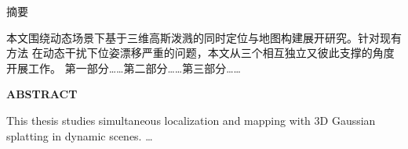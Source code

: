 %
%
%

\begin{center}
{\heiti{} 摘\quad 要}
\end{center}

\vspace{1\baselineskip}


本文围绕动态场景下基于三维高斯泼溅的同时定位与地图构建展开研究。针对现有方法
在动态干扰下位姿漂移严重的问题，本文从三个相互独立又彼此支撑的角度开展工作。
第一部分……第二部分……第三部分……

\vspace{1\baselineskip}

\newpage

\begin{center}
{\bfseries{}\rmfamily ABSTRACT}
\end{center}

\vspace{1\baselineskip}

This thesis studies simultaneous localization and mapping with 3D Gaussian
splatting in dynamic scenes. \ldots

\vspace{1\baselineskip}
